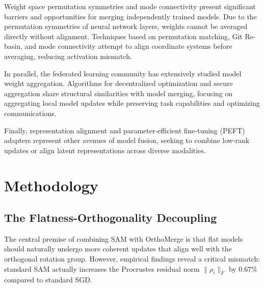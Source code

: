 \documentclass{article}
\theoremstyle{plain}
\theoremstyle{definition}
\theoremstyle{remark}
\begin{document}
Weight space permutation symmetries and mode connectivity present significant barriers and opportunities for merging independently trained models. Due to the permutation symmetries of neural network layers, weights cannot be averaged directly without alignment. Techniques based on permutation matching, Git Re-basin, and mode connectivity \cite{li2024enforcing,gelberg2024variational,pearcecrump2025permutation,sharma2024simultaneous,schatzki2022theoretical,rossi2023permutation,elbaz2025fskan,guttenberg2016permutationequivariant,zhou2023permutation,franke2025robustness,guerreropena2022rebasin,gupta2026deepweightflow} attempt to align coordinate systems before averaging, reducing activation mismatch.

In parallel, the federated learning community has extensively studied model weight aggregation. Algorithms for decentralized optimization and secure aggregation \cite{alluhaidan2024weight,wang2022asyncfeded,khan2023regularized,zhai2025decentralized,han2022defl,rehman2023ldawa,elniss2024simprox,singh2022local,chatzikonstantinou2023federated,khan2021adaptive,peng2026dynamic,shi2025fedawa} share structural similarities with model merging, focusing on aggregating local model updates while preserving task capabilities and optimizing communications.

Finally, representation alignment and parameter-efficient fine-tuning (PEFT) adapters \cite{li2025review,soudy2024deepfake,kio2024wavelet,garnier2024multigrid,losada2024bridging,lemos2022robust,garg2021dynamic,henry2020brain,kadmon2020predictive,simard2003best,fox2019training,lombard2025petimot} represent other avenues of model fusion, seeking to combine low-rank updates or align latent representations across diverse modalities.

\section{Methodology}
\label{sec:method}

\subsection{The Flatness-Orthogonality Decoupling}
The central premise of combining SAM with OrthoMerge is that flat models should naturally undergo more coherent updates that align well with the orthogonal rotation group. However, empirical findings reveal a critical mismatch: standard SAM actually increases the Procrustes residual norm $\|\rho_i\|_F$ by $0.67\%$ compared to standard SGD. 
\end{document}
